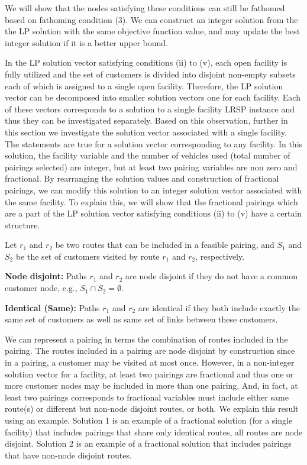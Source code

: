 We will show that the nodes satisfying these conditions can still be fathomed 
based on fathoming condition (3). We can construct an integer solution from the the LP 
solution with the same objective function value, and may update the best integer 
solution if it is a better upper bound.

In the LP solution vector satisfying conditions (ii) to (v), each open facility
is fully utilized and the set of customers is divided into disjoint non-empty 
subsets each of which is assigned to a single open facility. Therefore, the
LP solution vector can be decomposed into smaller solution vectors one for each 
facility. Each of these vectors corresponds to a solution to a single facility
LRSP instance and thus they can be investigated separately. Based on this
observation, further in this section we investigate the solution vector associated 
with a single facility. The statements are true for a solution vector corresponding 
to any facility. In this solution, the facility variable and the number of vehicles
used (total number of pairings selected) are integer, but at least two 
pairing variables are non zero and fractional. By rearranging the solution values 
and construction of fractional pairings, we can modify this solution to an integer 
solution vector associated with the same facility. To explain this, we will
show that the fractional pairings which are a part of the LP solution vector 
satisfying conditions (ii) to (v) have a certain structure.

Let $r_1$ and $r_2$ be two routes that can be included in a feasible pairing,
and $S_1$ and $S_2$ be the set of customers visited by route $r_1$ and $r_2$, 
respectively. 
\begin{defn}{\bf Node disjoint:}
Paths $r_1$ and $r_2$ are  node disjoint if they do not have a common customer 
node, e.g., $S_1\cap S_2 =\emptyset$.
\end{defn}
\begin{defn}{\bf Identical (Same):}
Paths $r_1$ and $r_2$ are  identical if they both include exactly the same set of
customers as well as same set of links between these customers. 
\end{defn}
We can represent a pairing in terms the combination of routes included in the 
pairing. The routes included in a pairing are node disjoint by construction
since in a pairing, a customer may be visited at most once. 
However, in a non-integer solution vector for a facility, at least two pairings
are fractional and thus one or more customer nodes may be included in more than 
one pairing. 
And, in fact, at least two pairings corresponds to fractional
variables 
must include either same route(s) or different but non-node disjoint routes,
or both. We explain this result using an example. Solution 1 is an example of a 
fractional solution (for a single facility) that includes pairings that share only 
identical routes, all routes are node disjoint. Solution 2 is an example of a 
fractional solution that includes pairings that have non-node disjoint routes.   

